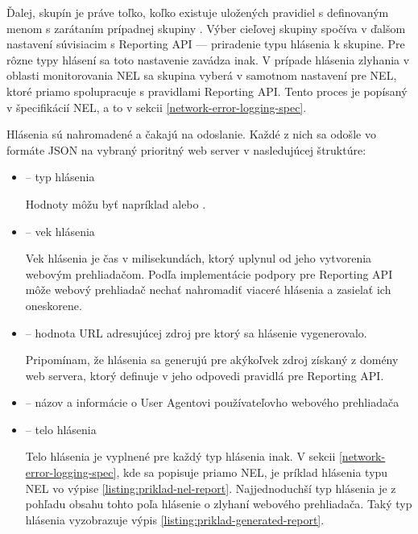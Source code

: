 Ďalej, skupín  je práve toľko, koľko existuje uložených pravidiel s definovaným menom s zarátaním prípadnej skupiny .
Výber cieľovej skupiny spočíva v ďalšom nastavení súvisiacim s Reporting API --- priradenie typu hlásenia k skupine.
Pre rôzne typy hlásení sa toto nastavenie zavádza inak.
V prípade hlásenia zlyhania v oblasti monitorovania NEL sa skupina  vyberá v samotnom nastavení pre NEL, ktoré priamo spolupracuje s pravidlami Reporting API.
Tento proces je popísaný v špecifikácií NEL, a to v sekcii \ref{network-error-logging-spec}.

Hlásenia sú nahromadené a čakajú na odoslanie.
Každé z nich sa odošle vo formáte JSON na vybraný prioritný web server v nasledujúcej štruktúre:
\begin{itemize}
    \item {} -- typ hlásenia

    Hodnoty môžu byť napríklad  alebo .
    
    \item {} -- vek hlásenia

    Vek hlásenia je čas v milisekundách, ktorý uplynul od jeho vytvorenia webovým prehliadačom.
    Podľa implementácie podpory pre Reporting API môže webový prehliadač nechať nahromadiť viaceré hlásenia a zasielať ich oneskorene.
    
    \item {} -- hodnota URL adresujúcej zdroj pre ktorý sa hlásenie vygenerovalo.

    Pripomínam, že hlásenia sa generujú pre akýkoľvek zdroj získaný z domény web servera, 
    ktorý definuje v jeho odpovedi pravidlá pre Reporting API.

    
    \item {} -- názov a informácie o User Agentovi používateľovho webového prehliadača
    
    \item {} -- telo hlásenia

    Telo hlásenia je vyplnené pre každý typ hlásenia inak. 
    V sekcii \ref{network-error-logging-spec}, kde sa popisuje priamo NEL, je príklad hlásenia typu NEL vo výpise \ref{listing:priklad-nel-report}.
    Najjednoduchší typ hlásenia je z pohľadu obsahu tohto poľa hlásenie o zlyhaní webového prehliadača.
    Taký typ hlásenia vyzobrazuje výpis \ref{listing:priklad-generated-report}.
\end{itemize}


